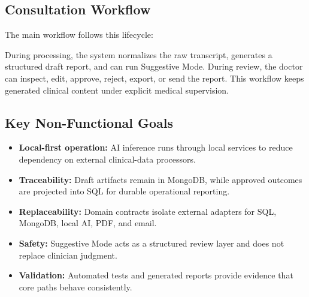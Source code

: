 \subsection{Consultation Workflow}

The main workflow follows this lifecycle:

\begin{center}
\end{center}

During processing, the system normalizes the raw transcript, generates a structured draft report, and can run Suggestive Mode. During review, the doctor can inspect, edit, approve, reject, export, or send the report. This workflow keeps generated clinical content under explicit medical supervision.

\subsection{Key Non-Functional Goals}

\begin{itemize}
  \item \textbf{Local-first operation:} AI inference runs through local services to reduce dependency on external clinical-data processors.
  \item \textbf{Traceability:} Draft artifacts remain in MongoDB, while approved outcomes are projected into SQL for durable operational reporting.
  \item \textbf{Replaceability:} Domain contracts isolate external adapters for SQL, MongoDB, local AI, PDF, and email.
  \item \textbf{Safety:} Suggestive Mode acts as a structured review layer and does not replace clinician judgment.
  \item \textbf{Validation:} Automated tests and generated reports provide evidence that core paths behave consistently.
\end{itemize}